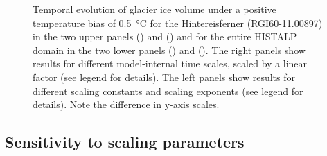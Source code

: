\begin{figure}[ht]
      \caption{Temporal evolution of glacier ice volume under a positive temperature bias of \SI{+0.5}{\celsius} for the Hintereisferner (RGI60-11.00897) in the two upper panels () and () and for the entire HISTALP domain in the two lower panels () and (). The right panels show results for different model-internal time scales, scaled by a linear factor (see legend for details). The left panels show results for different scaling constants and scaling exponents (see legend for details). Note the difference in y-axis scales.}
      \label{fig:sensitivity}
    \end{figure}

    \subsection{Sensitivity to scaling parameters} %
    \label{sec:sensitivity_to_scaling_parameters_results}


